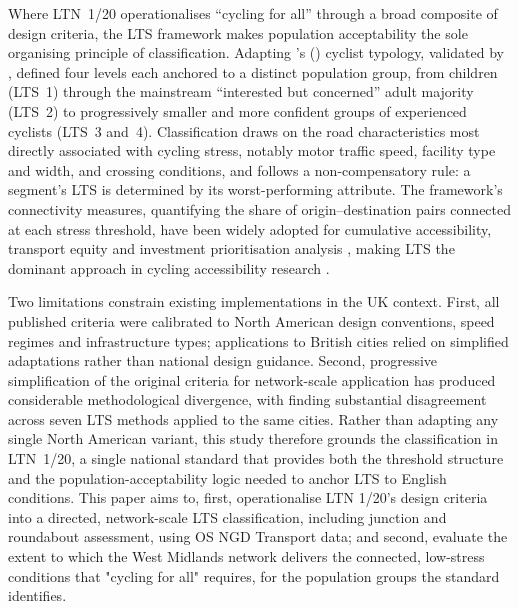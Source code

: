 \documentclass[final,5p,times,twocolumn,authoryear]{elsarticle}
\begin{document}
Where LTN~1/20 operationalises ``cycling for all'' through a broad composite of design criteria, the LTS framework makes population acceptability the sole organising principle of classification. Adapting \citeauthor{geller2009}'s (\citeyear{geller2009}) cyclist typology, validated by \citet{dill2013}, \citet{mekuria2012a} defined four levels each anchored to a distinct population group, from children (LTS~1) through the mainstream ``interested but concerned'' adult majority (LTS~2) to progressively smaller and more confident groups of experienced cyclists (LTS~3 and~4). Classification draws on the road characteristics most directly associated with cycling stress, notably motor traffic speed, facility type and width, and crossing conditions, and follows a non-compensatory rule: a segment's LTS is determined by its worst-performing attribute. The framework's connectivity measures, quantifying the share of origin--destination pairs connected at each stress threshold, have been widely adopted for cumulative accessibility, transport equity and investment prioritisation analysis \citep{furth2016, lowry2017, tucker2018, schon2024}, making LTS the dominant approach in cycling accessibility research \citep{louro2026}.

Two limitations constrain existing implementations in the UK context. First, all published criteria were calibrated to North American design conventions, speed regimes and infrastructure types; applications to British cities \citep{cervero2019, jeong2025} relied on simplified adaptations rather than national design guidance. Second, progressive simplification of the original criteria for network-scale application has produced considerable methodological divergence, with \citet{harvey2024} finding substantial disagreement across seven LTS methods applied to the same cities. Rather than adapting any single North American variant, this study therefore grounds the classification in LTN~1/20, a single national standard that provides both the threshold structure and the population-acceptability logic needed to anchor LTS to English conditions. This paper aims to, first, operationalise LTN 1/20's design criteria into a directed, network-scale LTS classification, including junction and roundabout assessment, using OS NGD Transport data; and second, evaluate the extent to which the West Midlands network delivers the connected, low-stress conditions that "cycling for all" requires, for the population groups the standard identifies.

\end{document}
